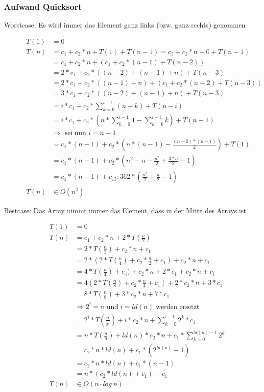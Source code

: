 \documentclass[a4paper,10pt]{article}
\newcommand{\T}[1]{\text{#1}} %
\newcommand{\Ra}{\Rightarrow}
\begin{document}
\subsubsection{Aufwand Quicksort}
\begin{description}
	\item[Worstcase: Es wird immer das Element ganz links (bzw. ganz rechts) genommen]
	\begin{align*}
		T(1) &= 0\\
		T(n) &= c_1 + c_2 * n + T(1) + T(n-1)  = c_1 + c_2 * n + 0 + T(n-1) \\
		&= c_1 + c_2 * n + (c_1 + c_2 * (n - 1) + T(n - 2))\\ 
		&= 2 * c_1 + c_2 * ((n-2) + (n-1) + n) + T(n-3) \\
		&= 2 * c_1 + c_2 * ((n-1) + n) + (c_1 + c_2 * (n-2) + T(n-3))\\
		&= 3 * c_1 + c_2 * ( (n - 2) + (n - 1) + n) + T(n-3) \\
		&= i * c_1 + c_2 * \sum_{k=0}^{i-1} (n-k) + T(n-i)\\ 
		&= i * c_1 + c_2 * (n * \sum_{k=0}^{i-1} 1 - \sum_{k=0}^{i-1} k) + T(n-1)\\
		&\Ra \T{ sei nun }i=n-1\\
		&= c_1 * (n-1) + c_2 * (n * (n-1) - \frac{(n-2) * (n-1)}{2}) + T(1) \\
		&= c_1 * (n-1) + c_2 * (n^2-n-\frac{n^2}{2} + \frac{3*n}{2} -1) \\
		&= c_1 * (n-1) + c_{15}:362 * (\frac{n^2}{2} + \frac{n}{2} -1) \\
		T(n) &\in O(n^2)
	\end{align*}
	\item[Bestcase: Das Array nimmt immer das Element, dass in der Mitte des Arrays ist]
	\begin{align*}
		T(1) &= 0 \\
		T(n) &= c_1 + c_2 * n + 2 * T(\frac{n}{2}) \\
		&= 2 * T(\frac{n}{2}) + c_2 * n + c_1 \\
		&= 2 *(2 * T(\frac{n}{4})+c_2*\frac{n}{2} + c_1) + c_2 * n + c_1\\ 
		&= 4  * T(\frac{n}{4}) + c_4) + c_2 * n + 2 * c_1 + c_2 * n + c_1 \\
		&= 4 ( 2* T(\frac{n}{8}) + c_2 * \frac{n}{4} + c_1) + 2 * c_2*n+3*c_1\\
		&=8*T(\frac{n}{8}) + 3 *c_2 * n + 7* c_1\\
		&\Ra 2^i=n \T{ und } i=ld(n) \T{ werden ersetzt}\\
		&=2^i * T(\frac{n}{2^i}) + i * c_2 * n + \sum_{k=0}^{i-1} 2^k*c_1 \\
		&= n* T(\frac{n}{n}) +ld(n)*c_2*n+ c_1 * \sum_{k=0}^{ld(n)-1} 2^k \\
		&=c_2 * n * ld(n) + c_1 *(2^{ld(n)} -1) \\
		&=c_2 * n * ld(n) + c_1 * (n-1) \\
		&= n * (c_2 * ld(n) + c_1) - c_1  \\
		T(n) &\in O( n \cdot log~n)
	\end{align*}
\end{description}
\end{document}
